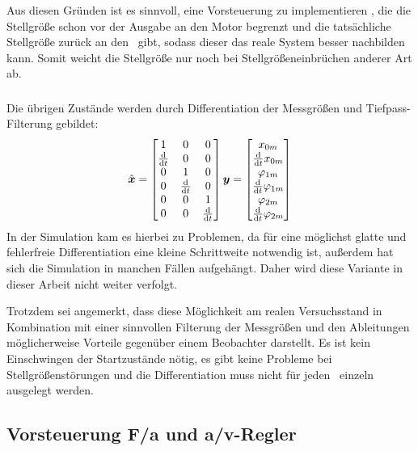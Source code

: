 Aus diesen Gründen ist es sinnvoll, eine Vorsteuerung zu implementieren , die die Stellgröße schon vor der Ausgabe an den Motor begrenzt und die tatsächliche Stellgröße zurück an den \beob\ gibt, sodass dieser das reale System besser nachbilden kann.
Somit weicht die Stellgröße nur noch bei Stellgrößeneinbrüchen anderer Art  ab.


\subsubsection{\diff}
Die übrigen Zustände werden durch Differentiation der Messgrößen und \evtl Tiefpass-Filterung gebildet:
\begin{align}
	\hat{\boldsymbol{x}}=\begin{bmatrix}
		1	&	0	&	0	\\
		\frac{\mathrm{d}}{\mathrm{d} t}	&	0	&	0	\\
		0	&	1	&	0	\\
		0	&	\frac{\mathrm{d}}{\mathrm{d} t}	&	0	\\
		0	&	0	&	1	\\
		0	&	0	&	\frac{\mathrm{d}}{\mathrm{d} t}	\\
	\end{bmatrix} \boldsymbol{y}  = \begin{bmatrix}
		x_{0m} \\ \frac{\mathrm{d}}{\mathrm{d} t} x_{0m} \\ \varphi_{1m} \\ \frac{\mathrm{d}}{\mathrm{d} t} \varphi_{1m} \\ \varphi_{2m} \\ \frac{\mathrm{d}}{\mathrm{d} t} \varphi_{2m}
	\end{bmatrix}
\end{align}
In der Simulation kam es hierbei zu Problemen, da für eine möglichst glatte und fehlerfreie Differentiation eine kleine Schrittweite notwendig ist, außerdem hat sich die Simulation in manchen Fällen aufgehängt. Daher wird diese Variante in dieser Arbeit nicht weiter verfolgt.

Trotzdem sei angemerkt, dass diese Möglichkeit am realen Versuchsstand in Kombination mit einer sinnvollen Filterung der Messgrößen und den Ableitungen möglicherweise Vorteile gegenüber einem Beobachter darstellt. 
Es ist kein Einschwingen der Startzustände nötig, es gibt keine Probleme bei Stellgrößenstörungen und die Differentiation muss nicht für jeden \ap\ einzeln ausgelegt werden.


\subsection{Vorsteuerung F/a und a/v-Regler}

